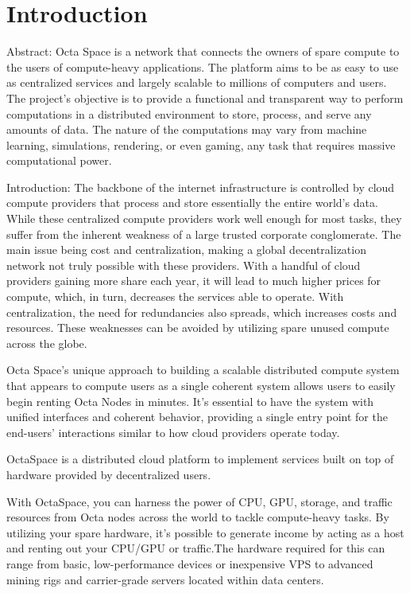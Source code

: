 \section{Introduction}
Abstract:
Octa Space is a network that connects the owners of spare compute to the users of compute-heavy applications. The platform aims to be as easy to use as centralized services and largely scalable to millions of computers and users. The project's objective is to provide a functional and transparent way to perform computations in a distributed environment to store, process, and serve any amounts of data. The nature of the computations may vary from machine learning, simulations, rendering, or even gaming, any task that requires massive computational power.

Introduction:
The backbone of the internet infrastructure is controlled by cloud compute providers that process and store essentially the entire world's data. While these centralized compute providers work well enough for most tasks, they suffer from the inherent weakness of a large trusted corporate conglomerate. The main issue being cost and centralization, making a global decentralization network not truly possible with these providers. With a handful of cloud providers gaining more share each year, it will lead to much higher prices for compute, which, in turn, decreases the services able to operate. With centralization, the need for redundancies also spreads, which increases costs and resources. These weaknesses can be avoided by utilizing spare unused compute across the globe.

Octa Space's unique approach to building a scalable distributed compute system that appears to compute users as a single coherent system allows users to easily begin renting Octa Nodes in minutes. It's essential to have the system with unified interfaces and coherent behavior, providing a single entry point for the end-users' interactions similar to how cloud providers operate today.

OctaSpace is a distributed cloud platform to implement services built on top of hardware provided by decentralized users.

With OctaSpace, you can harness the power of CPU, GPU, storage, and traffic resources from Octa nodes across the world to tackle compute-heavy tasks. By utilizing your spare hardware, it's possible to generate income by acting as a host and renting out your CPU/GPU or traffic.The hardware required for this can range from basic, low-performance devices or inexpensive VPS to advanced mining rigs and carrier-grade servers located within data centers.

